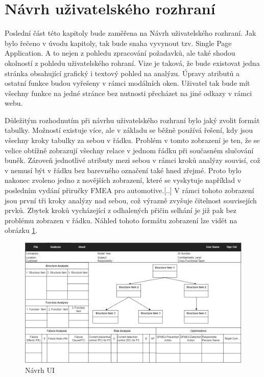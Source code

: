 \section{Návrh uživatelského rozhraní}
Poslední část této kapitoly bude zaměřena na Návrh uživatelského rozhraní. Jak bylo řečeno v úvodu kapitoly, tak bude snaha vyvynout tzv. Single Page Application. A to nejen z pohledu zpracování požadavků, ale také shodou okolností z pohledu uživatelského rohraní. Vize je taková, že bude existovat jedna stránka obsahující grafický i textový pohled na analýzu. Úpravy atributů a ostatní funkce budou vyřešeny v rámci modálních oken. Uživatel tak bude mít všechny funkce na jedné stránce bez nutnosti přecházet na jiné odkazy v rámci webu. 

Důležitým rozhodnutím při návrhu uživatelského rozhraní bylo jaký zvolit formát tabulky. Možností existuje více, ale v základu se běžně používá řešení, kdy jsou všechny kroky tabulky za sebou v řádku. Problém v tomto zobrazení je ten, že se velice obtížně zobrazují všechny relace v jednom řádku při současném slučování buněk. Zároveň jednotlivé atributy mezi sebou v rámci kroků analýzy souvisí, což v nemusí být v řádku bez barevného označení také hned zřejmé. Proto bylo nakonec zvoleno jedno z novějších zobrazení, které se vyskytuje například v posledním vydání přiručky FMEA pro automotive.[..] V rámci tohoto zobrazení jsou první tři kroky analýzy nad sebou, což výrazně zvyšuje čitelnost souvisejích prvků. Zbytek kroků vycházející z odhalených přičin selhání je již pak bez problému zobrazen v řádku. Náhled tohoto formátu zobrazení lze vidět na obrázku \ref{fig:ui}.

\begin{figure}[h]
\centering
	\includegraphics[width=1.0\textwidth]{Figures/mockup3.png}
	\caption{Návrh UI }
	\label{fig:ui}
\end{figure}